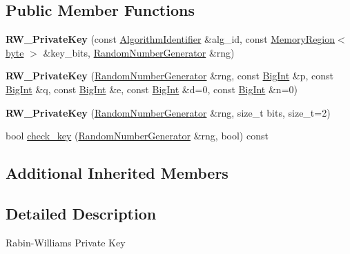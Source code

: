 \subsection*{Public Member Functions}
\begin{DoxyCompactItemize}
\item 
\hypertarget{classBotan_1_1RW__PrivateKey_ac484862f2de2de327129cae34195b634}{{\bfseries R\-W\-\_\-\-Private\-Key} (const \hyperlink{classBotan_1_1AlgorithmIdentifier}{Algorithm\-Identifier} \&alg\-\_\-id, const \hyperlink{classBotan_1_1MemoryRegion}{Memory\-Region}$<$ \hyperlink{namespaceBotan_a7d793989d801281df48c6b19616b8b84}{byte} $>$ \&key\-\_\-bits, \hyperlink{classBotan_1_1RandomNumberGenerator}{Random\-Number\-Generator} \&rng)}\label{classBotan_1_1RW__PrivateKey_ac484862f2de2de327129cae34195b634}

\item 
\hypertarget{classBotan_1_1RW__PrivateKey_a4f59c46f1c9bbd81c9d8311622d6839c}{{\bfseries R\-W\-\_\-\-Private\-Key} (\hyperlink{classBotan_1_1RandomNumberGenerator}{Random\-Number\-Generator} \&rng, const \hyperlink{classBotan_1_1BigInt}{Big\-Int} \&p, const \hyperlink{classBotan_1_1BigInt}{Big\-Int} \&q, const \hyperlink{classBotan_1_1BigInt}{Big\-Int} \&e, const \hyperlink{classBotan_1_1BigInt}{Big\-Int} \&d=0, const \hyperlink{classBotan_1_1BigInt}{Big\-Int} \&n=0)}\label{classBotan_1_1RW__PrivateKey_a4f59c46f1c9bbd81c9d8311622d6839c}

\item 
\hypertarget{classBotan_1_1RW__PrivateKey_a5276eb13228d57f46d4a55931930fa9d}{{\bfseries R\-W\-\_\-\-Private\-Key} (\hyperlink{classBotan_1_1RandomNumberGenerator}{Random\-Number\-Generator} \&rng, size\-\_\-t bits, size\-\_\-t=2)}\label{classBotan_1_1RW__PrivateKey_a5276eb13228d57f46d4a55931930fa9d}

\item 
bool \hyperlink{classBotan_1_1RW__PrivateKey_a6985335b2b61044870cd94162347e4c3}{check\-\_\-key} (\hyperlink{classBotan_1_1RandomNumberGenerator}{Random\-Number\-Generator} \&rng, bool) const 
\end{DoxyCompactItemize}
\subsection*{Additional Inherited Members}


\subsection{Detailed Description}
Rabin-\/\-Williams Private Key 

